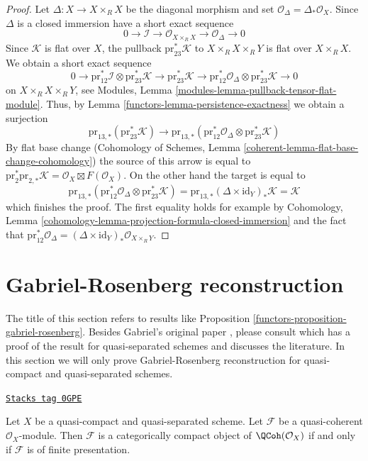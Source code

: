 \begin{proof}

Let $\Delta : X \to X \times_R X$ be the diagonal morphism and
set $\mathcal{O}_\Delta = \Delta_*\mathcal{O}_X$.
Since $\Delta$ is a closed immersion have a short exact sequence
$$
0 \to \mathcal{I} \to
\mathcal{O}_{X \times_R X} \to \mathcal{O}_\Delta \to 0
$$
Since $\mathcal{K}$ is flat over $X$, the pullback
$\text{pr}_{23}^*\mathcal{K}$ to $X \times_R X \times_R Y$
is flat over $X \times_R X$. We obtain a short exact sequence
$$
0 \to
\text{pr}_{12}^*\mathcal{I}
\otimes
\text{pr}_{23}^*\mathcal{K} \to
\text{pr}_{23}^*\mathcal{K} \to
\text{pr}_{12}^*\mathcal{O}_\Delta
\otimes
\text{pr}_{23}^*\mathcal{K} \to 0
$$
on $X \times_R X \times_R Y$, see
Modules, Lemma \ref{modules-lemma-pullback-tensor-flat-module}.
Thus, by Lemma \ref{functors-lemma-persistence-exactness}
we obtain a surjection
$$
\text{pr}_{13, *}(\text{pr}_{23}^*\mathcal{K})
\to
\text{pr}_{13, *}(
\text{pr}_{12}^*\mathcal{O}_\Delta
\otimes
\text{pr}_{23}^*\mathcal{K})
$$
By flat base change
(Cohomology of Schemes, Lemma \ref{coherent-lemma-flat-base-change-cohomology})
the source of this arrow is equal to $\text{pr}_2^*\text{pr}_{2, *}\mathcal{K}
= \mathcal{O}_X \boxtimes F(\mathcal{O}_X)$. On the other hand the target is
equal to
$$
\text{pr}_{13, *}(
\text{pr}_{12}^*\mathcal{O}_\Delta
\otimes
\text{pr}_{23}^*\mathcal{K}) =
\text{pr}_{13, *} (\Delta \times \text{id}_Y)_* \mathcal{K} =
\mathcal{K}
$$
which finishes the proof. The first equality holds for example by
Cohomology, Lemma \ref{cohomology-lemma-projection-formula-closed-immersion}
and the fact that $\text{pr}_{12}^*\mathcal{O}_\Delta =
(\Delta \times \text{id}_Y)_*\mathcal{O}_{X \times_R Y}$.
\end{proof}

\section{Gabriel-Rosenberg reconstruction}
\label{functors-section-gabriel}
The title of this section refers to results like
Proposition \ref{functors-proposition-gabriel-rosenberg}.
Besides Gabriel's original paper \cite{Gabriel}, please consult
\cite{Brandenburg} which has a proof of the result for quasi-separated schemes
and discusses the literature. In this section we will only prove
Gabriel-Rosenberg reconstruction for quasi-compact and quasi-separated schemes.

\begin{lemma}
\label{functors-lemma-categorically-compact-QCoh}
\href{https://stacks.math.columbia.edu/tag/0GPE}{\texttt{Stacks tag 0GPE}}

Let $X$ be a quasi-compact and quasi-separated scheme.
Let $\mathcal{F}$ be a quasi-coherent $\mathcal{O}_X$-module.
Then $\mathcal{F}$ is a categorically compact object of
$\QCoh(\mathcal{O}_X)$ if and only if $\mathcal{F}$ is of
finite presentation.
\end{lemma}

